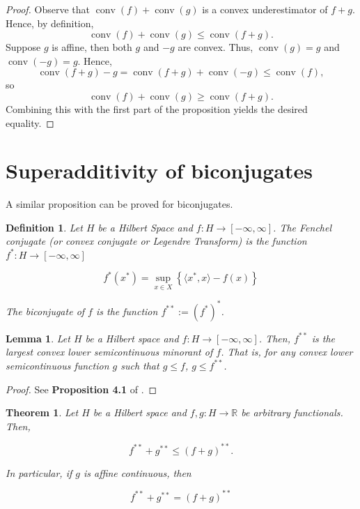 \documentclass[11pt]{article}
\newtheorem{definition}{Definition}
\newtheorem{theorem}{Theorem}
\newtheorem{lemma}{Lemma}
\DeclareMathOperator*{\conv}{conv}
\newcommand{\R}{\mathbb{R}}
\begin{document}
	
	\begin{proof}
		Observe that $\conv(f) + \conv(g)$ is a convex underestimator of $f + g$. Hence, by definition,
		\[  \conv(f) + \conv(g)\leq \conv(f+g).
		\]
		Suppose $g$ is affine, then both $g$ and $-g$ are convex. Thus, $\conv(g) = g$ and $\conv(-g)=g$. Hence,
		\[	\conv(f + g) - g = \conv(f+g) + \conv(-g) \leq \conv(f),
				\]
		so 
		\[	\conv(f) + \conv(g) \geq \conv(f + g).
				\]
		Combining this with the first part of the proposition yields the desired equality.
		\end{proof}
	
	
	\section{Superadditivity of biconjugates}
	A similar proposition can be proved for biconjugates. 
	\begin{definition}
		Let $H$ be a Hilbert Space and $f:H\to[-\infty, \infty]$. The Fenchel conjugate (or convex conjugate or Legendre Transform) is the function $f^{*}:H\to[-\infty, \infty]$
		
		\[	f^{*}(x^*) = \sup_{x\in X} \left\{		\langle x^{*}, x\rangle - f(x)
													\right\}
				\]
		
		\noindent The biconjugate of $f$ is the function $f^{**} := (f^*)^*$.
		\end{definition}
	
	\begin{lemma}
		\label{lem:biconjugatelsc}
		Let $H$ be a Hilbert space and $f:H\to[-\infty, \infty]$. Then, $f^{**}$ is the largest convex lower semicontinuous minorant of $f$. That is, for any convex lower semicontinuous function $g$ such that $g\leq f$, $g\leq f^{**}$.
		\end{lemma}
	
	\begin{proof}
		See \textbf{Proposition 4.1} of \cite{Ekeland}.
		\end{proof}
	
	\begin{theorem}
		Let $H$ be a Hilbert space and $f,g:H\to\R$ be arbitrary functionals. Then, 
		
		\[	f^{**} + g^{**} \leq (f+g)^{**}.
		\]
		
		\noindent In particular, if $g$ is affine continuous, then 
		
		\[	f^{**} + g^{**} = (f+g)^{**}
		\]
	\end{theorem}
	
\end{document}
